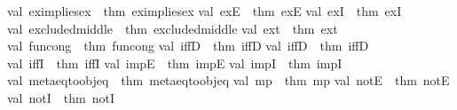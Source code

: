 \begin{isabellebody}
val\ ex{}{\isacharunderscore}{\kern0pt}implies{\isacharunderscore}{\kern0pt}ex\ {\isacharequal}{\kern0pt}\ {\isacharat}{\kern0pt}{\isacharbraceleft}{\kern0pt}thm\ ex{}{\isacharunderscore}{\kern0pt}implies{\isacharunderscore}{\kern0pt}ex{\isacharbraceright}{\kern0pt}\isanewline
val\ exE\ {\isacharequal}{\kern0pt}\ {\isacharat}{\kern0pt}{\isacharbraceleft}{\kern0pt}thm\ exE{\isacharbraceright}{\kern0pt}\isanewline
val\ exI\ {\isacharequal}{\kern0pt}\ {\isacharat}{\kern0pt}{\isacharbraceleft}{\kern0pt}thm\ exI{\isacharbraceright}{\kern0pt}\isanewline
val\ excluded{\isacharunderscore}{\kern0pt}middle\ {\isacharequal}{\kern0pt}\ {\isacharat}{\kern0pt}{\isacharbraceleft}{\kern0pt}thm\ excluded{\isacharunderscore}{\kern0pt}middle{\isacharbraceright}{\kern0pt}\isanewline
val\ ext\ {\isacharequal}{\kern0pt}\ {\isacharat}{\kern0pt}{\isacharbraceleft}{\kern0pt}thm\ ext{\isacharbraceright}{\kern0pt}\isanewline
val\ fun{\isacharunderscore}{\kern0pt}cong\ {\isacharequal}{\kern0pt}\ {\isacharat}{\kern0pt}{\isacharbraceleft}{\kern0pt}thm\ fun{\isacharunderscore}{\kern0pt}cong{\isacharbraceright}{\kern0pt}\isanewline
val\ iffD{}\ {\isacharequal}{\kern0pt}\ {\isacharat}{\kern0pt}{\isacharbraceleft}{\kern0pt}thm\ iffD{}{\isacharbraceright}{\kern0pt}\isanewline
val\ iffD{}\ {\isacharequal}{\kern0pt}\ {\isacharat}{\kern0pt}{\isacharbraceleft}{\kern0pt}thm\ iffD{}{\isacharbraceright}{\kern0pt}\isanewline
val\ iffI\ {\isacharequal}{\kern0pt}\ {\isacharat}{\kern0pt}{\isacharbraceleft}{\kern0pt}thm\ iffI{\isacharbraceright}{\kern0pt}\isanewline
val\ impE\ {\isacharequal}{\kern0pt}\ {\isacharat}{\kern0pt}{\isacharbraceleft}{\kern0pt}thm\ impE{\isacharbraceright}{\kern0pt}\isanewline
val\ impI\ {\isacharequal}{\kern0pt}\ {\isacharat}{\kern0pt}{\isacharbraceleft}{\kern0pt}thm\ impI{\isacharbraceright}{\kern0pt}\isanewline
val\ meta{\isacharunderscore}{\kern0pt}eq{\isacharunderscore}{\kern0pt}to{\isacharunderscore}{\kern0pt}obj{\isacharunderscore}{\kern0pt}eq\ {\isacharequal}{\kern0pt}\ {\isacharat}{\kern0pt}{\isacharbraceleft}{\kern0pt}thm\ meta{\isacharunderscore}{\kern0pt}eq{\isacharunderscore}{\kern0pt}to{\isacharunderscore}{\kern0pt}obj{\isacharunderscore}{\kern0pt}eq{\isacharbraceright}{\kern0pt}\isanewline
val\ mp\ {\isacharequal}{\kern0pt}\ {\isacharat}{\kern0pt}{\isacharbraceleft}{\kern0pt}thm\ mp{\isacharbraceright}{\kern0pt}\isanewline
val\ notE\ {\isacharequal}{\kern0pt}\ {\isacharat}{\kern0pt}{\isacharbraceleft}{\kern0pt}thm\ notE{\isacharbraceright}{\kern0pt}\isanewline
val\ notI\ {\isacharequal}{\kern0pt}\ {\isacharat}{\kern0pt}{\isacharbraceleft}{\kern0pt}thm\ notI{\isacharbraceright}{\kern0pt}\isanewline

\end{isabellebody}
